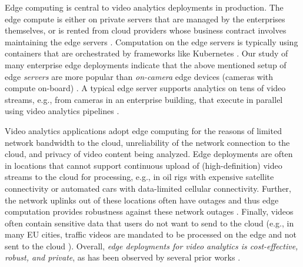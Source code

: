 Edge computing is central to video analytics deployments \cite{ieee-computer, edge1, edge2} in production. The edge compute is either on private servers that are managed by the enterprises themselves, or is rented from cloud providers whose business contract involves maintaining the edge servers \cite{aws-outpost, azure-stack-edge}. Computation on the edge servers is typically using containers that are orchestrated by frameworks like Kubernetes \cite{kubernetes}. Our study of many enterprise edge deployments indicate that the above mentioned setup of edge {\em servers} are more popular than {\em on-camera} edge devices (cameras with compute on-board) %
\cite{something}. %
A typical edge server supports analytics on tens of video streams, e.g., from cameras in an enterprise building, that execute in parallel using video analytics pipelines \cite{rocket}. 

Video analytics applications adopt edge computing for the reasons of limited network bandwidth to the cloud, unreliability of the network connection to the cloud, and privacy of video content being analyzed. Edge deployments are often in locations that cannot support continuous upload of (high-definition) video streams to the cloud for processing, e.g., in oil rigs with expensive satellite connectivity or automated cars with data-limited cellular connectivity. Further, the network uplinks out of these locations often have outages and thus edge computation provides robustness against these network outages \cite{chick-fill}. Finally, videos often contain sensitive data that users do not want to send to the cloud (e.g., in many EU cities, traffic videos are mandated to be processed on the edge and not sent to the cloud \cite{sweden}). Overall, {\em edge deployments for video analytics is cost-effective, robust, and private}, as has been observed by several prior works \cite{edge, compute, references}. 

